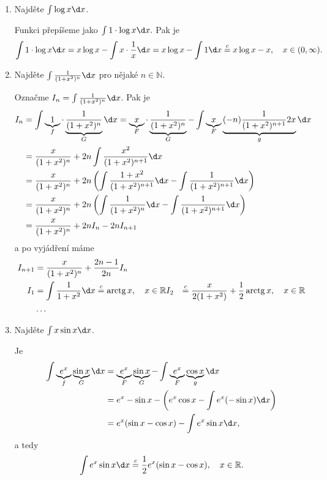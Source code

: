 \begin{priklad}\,
\begin{enumerate}[(1)]
	\item Najděte $\int\log x \d x$.
	\par Funkci přepíšeme jako $\int 1\cdot \log x \d x.$ Pak je
	$$
	    \int 1\cdot \log x \d x = x\log x - \int x \cdot \frac{1}{x} \d x = x\log x - \int 1 \d x \stackrel{c}{=} x\log x -x, \quad x \in (0,\infty).
	$$
	\item Najděte $\int \frac{1}{(1+x^2)^n}\d x$ pro nějaké $n \in \mathbb N $.
	\par Označme $I_n = \int \frac{1}{(1+x^2)^n}\d x$. Pak je
	\begin{align*}
	I_n &= \int \underbrace{1}_{f}\cdot \underbrace{\frac{1}{(1+x^2)^n}}_{G}\d x = \underbrace{x}_{F}\cdot \underbrace{\frac{1}{(1+x^2)^n}}_{G} - \int \underbrace{x}_{F} \underbrace{(-n)\frac{1}{(1+x^2)^{n+1}}2x}_{g}\d x\\
&= \frac{x}{(1+x^2)^n}+ 2n \int \frac{x^2}{(1+x^2)^{n+1}}\d x\\
&= \frac{x}{(1+x^2)^n} + 2n \left( \int \frac{1+x^2}{(1+x^2)^{n+1}}\d x - \int \frac{1}{(1+x^2)^{n+1}}\d x \right )\\
&= \frac{x}{(1+x^2)^n} + 2n \left( \int \frac{1}{(1+x^2)^n}\d x - \int \frac{1}{(1+x^2)^{n+1}}\d x \right )\\
&= \frac{x}{(1+x^2)^n} + 2nI_n - 2nI_{n+1}
\end{align*}
a po vyjádření máme
\begin{align*}
	I_{n+1} &= \frac{x}{(1+x^2)^n} + \frac{2n-1}{2n} I_n\\
	I_1 &= \int \frac{1}{1+x^2}\d x \stackrel{c}{=} \arctg x, \quad x \in \mathbb R
	I_2 &\stackrel{c}{=} \frac{x}{2(1+x^2)}+\frac{1}{2}\arctg x, \quad x \in \mathbb R\\
	& \dots
\end{align*}
\item Najděte $\int x \sin x \d x$.
\par Je
\begin{align*}
\int \underbrace{e^x}_{f}\underbrace{\sin x}_{G} \d x &= \underbrace{e^x}_{F}\underbrace{\sin x }_{G} - \int \underbrace{e^x}_{F}\underbrace{\cos x}_g \d x\\
&= e^x - \sin x - \left( e^x\cos x - \int e^x (-\sin x)\d x\right )\\
&= e^x(\sin x -\cos x) - \int e^x \sin x \d x,
\end{align*}
a tedy
$$
    \int e^x \sin x \d x \stackrel{c}{=} \frac{1}{2} e^x (\sin x - \cos x), \quad x \in \mathbb R.
$$
\end{enumerate}
\end{priklad}

